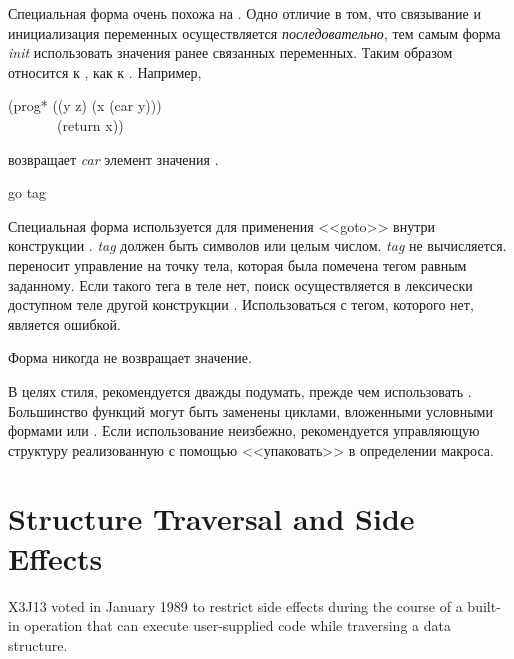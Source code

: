 \begin{defmac}
Специальная форма  очень похожа на . Одно отличие в том,
что связывание и инициализация переменных осуществляется \emph{последовательно},
тем самым форма \emph{init} использовать значения ранее связанных переменных.
Таким образом  относится к , как  к .
Например,
\begin{lisp}
(prog* ((y z) (x (car y))) \\
~~~~~~~(return x))
\end{lisp}
возвращает \emph{car} элемент значения .
\end{defmac}

\begin{defspec}
go tag

Специальная форма  используется для применения <<goto>>
внутри конструкции . \emph{tag} должен быть символов или целым
числом. \emph{tag} не вычисляется.
 переносит управление на точку тела, которая была помечена тегом равным
 заданному. Если такого тега в теле нет, поиск осуществляется в
лексически доступном теле другой конструкции .
Использоваться  с тегом, которого нет, является ошибкой.

Форма  никогда не возвращает значение.

В целях стиля, рекомендуется дважды подумать, прежде чем использовать
. Большинство функций  могут быть заменены циклами, вложенными
условными формами или . Если использование  неизбежно,
рекомендуется управляющую структуру реализованную с помощью  <<упаковать>>
в определении макроса. 
\end{defspec}


\section{Structure Traversal and Side Effects}
\label{STRUCTURE-TRAVERSAL-SECTION}

X3J13 voted in January 1989 
to restrict side effects during the course
of a built-in operation that can execute user-supplied code while
traversing a data structure.

